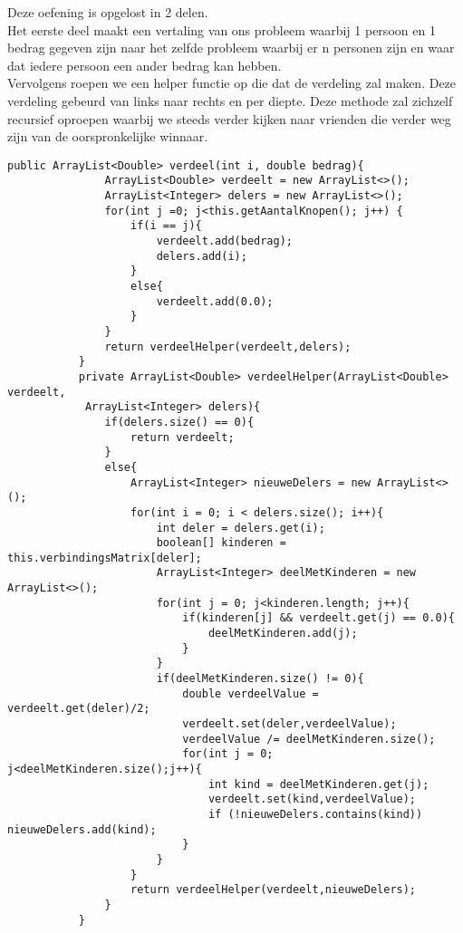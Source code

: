 \begin{Oplossing}{10.9}
Deze oefening is opgelost in 2 delen. \\ Het eerste deel maakt een vertaling van ons probleem waarbij 1 persoon en 1 bedrag gegeven zijn naar het zelfde probleem waarbij er n personen zijn en waar dat iedere persoon een ander bedrag kan hebben.\\
Vervolgens roepen we een helper functie op die dat de verdeling zal maken. Deze verdeling gebeurd van links naar rechts en per diepte. Deze methode zal zichzelf recursief oproepen waarbij we steeds verder kijken naar vrienden die verder weg zijn van de oorspronkelijke winnaar.
     \begin{lstlisting}[caption={verdeel(i, bedrag) methode}, label=bstaddnode]
          public ArrayList<Double> verdeel(int i, double bedrag){
               ArrayList<Double> verdeelt = new ArrayList<>();
               ArrayList<Integer> delers = new ArrayList<>();
               for(int j =0; j<this.getAantalKnopen(); j++) {
                   if(i == j){
                       verdeelt.add(bedrag);
                       delers.add(i);
                   }
                   else{
                       verdeelt.add(0.0);
                   }
               }
               return verdeelHelper(verdeelt,delers);
           }
           private ArrayList<Double> verdeelHelper(ArrayList<Double> verdeelt,
            ArrayList<Integer> delers){
               if(delers.size() == 0){
                   return verdeelt;
               }
               else{
                   ArrayList<Integer> nieuweDelers = new ArrayList<>();
                   for(int i = 0; i < delers.size(); i++){
                       int deler = delers.get(i);
                       boolean[] kinderen = this.verbindingsMatrix[deler];
                       ArrayList<Integer> deelMetKinderen = new ArrayList<>();
                       for(int j = 0; j<kinderen.length; j++){
                           if(kinderen[j] && verdeelt.get(j) == 0.0){
                               deelMetKinderen.add(j);
                           }
                       }
                       if(deelMetKinderen.size() != 0){
                           double verdeelValue = verdeelt.get(deler)/2;
                           verdeelt.set(deler,verdeelValue);
                           verdeelValue /= deelMetKinderen.size();
                           for(int j = 0; j<deelMetKinderen.size();j++){
                               int kind = deelMetKinderen.get(j);
                               verdeelt.set(kind,verdeelValue);
                               if (!nieuweDelers.contains(kind)) nieuweDelers.add(kind);
                           }
                       }
                   }
                   return verdeelHelper(verdeelt,nieuweDelers);
               }
           }
          \end{lstlisting}
\end{Oplossing}
\begin{Oplossing}{10.10}

\end{Oplossing}

